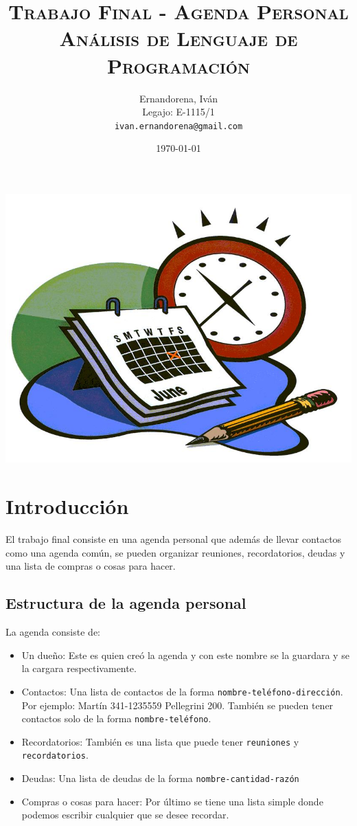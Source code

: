 \documentclass[a4paper,12pt]{article}
\author{
        Ernandorena, Iván\\
        Legajo: E-1115/1\\
        \texttt{ivan.ernandorena@gmail.com}
}
\date{\today}
\title {
    \Huge\textsc{Trabajo Final - Agenda Personal\\}
    \large\textsc{Análisis de Lenguaje de Programación}
}
\begin{document}
  \thispagestyle{empty}
  \maketitle
  \begin{center}
  \includegraphics[scale=0.5]{photo}
  \end{center}

  \newpage
  \section*{Introducción}
    El trabajo final consiste en una agenda personal que además de llevar contactos como una agenda común, se
    pueden organizar reuniones, recordatorios, deudas y una lista de compras o cosas para hacer.
    \subsection*{Estructura de la agenda personal}
    La agenda consiste de:
    \begin{itemize}
      \item Un dueño: Este es quien creó la agenda y con este nombre se la guardara y se la cargara respectivamente.
      \item Contactos: Una lista de contactos de la forma \texttt{nombre-teléfono-dirección}.\\
      Por ejemplo: Martín 341-1235559 Pellegrini 200. También se pueden tener contactos solo de la forma \texttt{nombre-teléfono}.
      \item Recordatorios: También es una lista que puede tener \texttt{reuniones} y \texttt{recordatorios}.
      \item Deudas: Una lista de deudas de la forma \texttt{nombre-cantidad-razón}
      \item Compras o cosas para hacer: Por último se tiene una lista simple donde podemos escribir cualquier que se desee recordar.
    \end{itemize}
\end{document}
